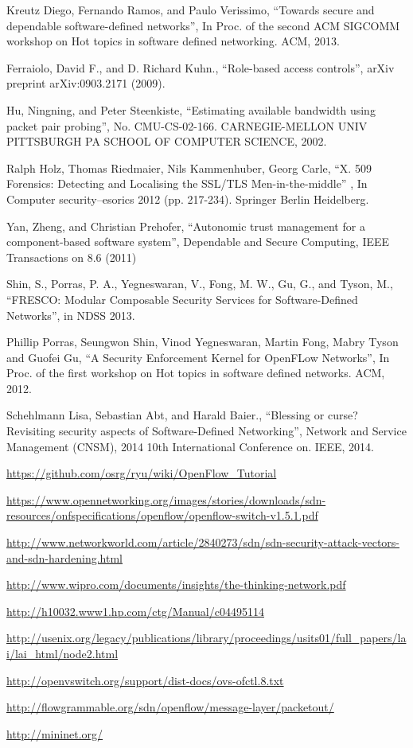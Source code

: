 \begin{thebibliography}{1}
Kreutz Diego, Fernando Ramos, and Paulo Verissimo, 
``Towards secure and dependable software-defined networks'', In Proc. of the second ACM SIGCOMM workshop on Hot topics in software defined networking. ACM, 2013.


Ferraiolo, David F., and D. Richard Kuhn., 
``Role-based access controls'', arXiv preprint arXiv:0903.2171 (2009).

\bibitem{}
Hu, Ningning, and Peter Steenkiste,
``Estimating available bandwidth using packet pair probing'', No. CMU-CS-02-166. CARNEGIE-MELLON UNIV PITTSBURGH PA SCHOOL OF COMPUTER SCIENCE, 2002.

Ralph Holz, Thomas Riedmaier, Nils Kammenhuber, Georg Carle, 
``X. 509 Forensics: Detecting and Localising the SSL/TLS Men-in-the-middle'' , In Computer security–esorics 2012 (pp. 217-234). Springer Berlin Heidelberg.

Yan, Zheng, and Christian Prehofer,
``Autonomic trust management for a component-based software system'', Dependable and Secure Computing, IEEE Transactions on 8.6 (2011)

Shin, S., Porras, P. A., Yegneswaran, V., Fong, M. W., Gu, G., and Tyson, M.,
``FRESCO: Modular Composable Security Services for Software-Defined Networks'', in NDSS 2013.

Phillip Porras, Seungwon Shin, Vinod Yegneswaran, Martin Fong, Mabry Tyson and Guofei Gu,
``A Security Enforcement Kernel for OpenFLow Networks'', In Proc. of the first workshop on Hot topics in software defined networks. ACM, 2012.

Schehlmann Lisa, Sebastian Abt, and Harald Baier., 
``Blessing or curse? Revisiting security aspects of Software-Defined Networking'', Network and Service Management (CNSM), 2014 10th International Conference on. IEEE, 2014.

\url{https://github.com/osrg/ryu/wiki/OpenFlow_Tutorial}

\url{https://www.opennetworking.org/images/stories/downloads/sdn-resources/onfspecifications/openflow/openflow-switch-v1.5.1.pdf}

\url{http://www.networkworld.com/article/2840273/sdn/sdn-security-attack-vectors-and-sdn-hardening.html}

\url{http://www.wipro.com/documents/insights/the-thinking-network.pdf}

\url{http://h10032.www1.hp.com/ctg/Manual/c04495114}

\url{http://usenix.org/legacy/publications/library/proceedings/usits01/full_papers/lai/lai_html/node2.html}

\url{http://openvswitch.org/support/dist-docs/ovs-ofctl.8.txt}

\url{http://flowgrammable.org/sdn/openflow/message-layer/packetout/}

\url{http://mininet.org/}

\end{thebibliography}